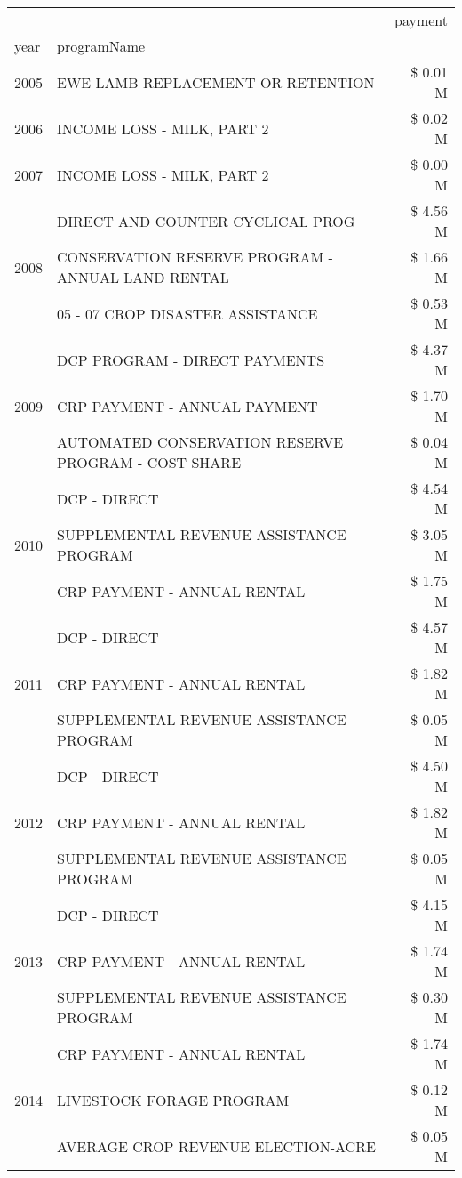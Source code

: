 \begin{tabular}{llr}
\toprule
 &  & payment \\
year & programName &  \\
\midrule
2005 & EWE LAMB REPLACEMENT OR RETENTION & \$ 0.01 M \\
\cline{1-3}
2006 & INCOME LOSS - MILK, PART 2 & \$ 0.02 M \\
\cline{1-3}
2007 & INCOME LOSS - MILK, PART 2 & \$ 0.00 M \\
\cline{1-3}
\multirow[t]{3}{*}{2008} & DIRECT AND COUNTER CYCLICAL PROG & \$ 4.56 M \\
 & CONSERVATION RESERVE PROGRAM - ANNUAL LAND RENTAL & \$ 1.66 M \\
 & 05 - 07 CROP DISASTER ASSISTANCE & \$ 0.53 M \\
\cline{1-3}
\multirow[t]{3}{*}{2009} & DCP PROGRAM - DIRECT PAYMENTS & \$ 4.37 M \\
 & CRP PAYMENT - ANNUAL PAYMENT & \$ 1.70 M \\
 & AUTOMATED CONSERVATION RESERVE PROGRAM - COST SHARE & \$ 0.04 M \\
\cline{1-3}
\multirow[t]{3}{*}{2010} & DCP - DIRECT & \$ 4.54 M \\
 & SUPPLEMENTAL REVENUE ASSISTANCE PROGRAM & \$ 3.05 M \\
 & CRP PAYMENT - ANNUAL RENTAL & \$ 1.75 M \\
\cline{1-3}
\multirow[t]{3}{*}{2011} & DCP - DIRECT & \$ 4.57 M \\
 & CRP PAYMENT - ANNUAL RENTAL & \$ 1.82 M \\
 & SUPPLEMENTAL REVENUE ASSISTANCE PROGRAM & \$ 0.05 M \\
\cline{1-3}
\multirow[t]{3}{*}{2012} & DCP - DIRECT & \$ 4.50 M \\
 & CRP PAYMENT - ANNUAL RENTAL & \$ 1.82 M \\
 & SUPPLEMENTAL REVENUE ASSISTANCE PROGRAM & \$ 0.05 M \\
\cline{1-3}
\multirow[t]{3}{*}{2013} & DCP - DIRECT & \$ 4.15 M \\
 & CRP PAYMENT - ANNUAL RENTAL & \$ 1.74 M \\
 & SUPPLEMENTAL REVENUE ASSISTANCE PROGRAM & \$ 0.30 M \\
\cline{1-3}
\multirow[t]{3}{*}{2014} & CRP PAYMENT - ANNUAL RENTAL & \$ 1.74 M \\
 & LIVESTOCK FORAGE PROGRAM & \$ 0.12 M \\
 & AVERAGE CROP REVENUE ELECTION-ACRE & \$ 0.05 M \\

\end{tabular}
